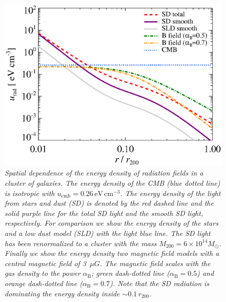 \documentclass[10pt,aps,pra,reprint,amsmath,amsfonts,amssymb,showpacs,nofootinbib,floatfix]{revtex4-1}
\newcommand{\rmn}{\mathrm}
\newcommand{\msun}{M_\odot}
\newcommand{\rvir}{r_{200}}
\newcommand{\mvir}{M_{200}}
\begin{document}
\begin{figure}%
 \includegraphics[width=0.99\columnwidth]{figures/ucool.eps}
 \caption{\it Spatial dependence of the energy density of radiation
   fields in a cluster of galaxies. The energy density of the CMB
   (blue dotted line) is isotropic with
   $u_\rmn{cmb}=0.26\,\rmn{eV}\,\rmn{cm}^{-3}$. The energy density of
   the light from stars and dust (SD) is denoted by the red dashed
   line and the solid purple line for the total SD light and the
   smooth SD light, respectively. For comparison we show the energy
   density of the stars and a low dust model (SLD) with the light blue
   line. The SD light has been renormalized to a cluster with the mass
   $\mvir=6\times10^{14}\msun$. Finally we show the energy density two
   magnetic field models with a central magnetic field of 3~$\mu
   G$. The magnetic field scales with the gas density to the power
   $\alpha_\rmn{B}$; green dash-dotted line ($\alpha_\rmn{B}=0.5$) and
   orange dash-dotted line ($\alpha_\rmn{B}=0.7$). Note that the SD
   radiation is dominating the energy density inside
   $\sim0.1\,\rvir$.}
 \label{fig:SD_Edens}
\end{figure}
\end{document}

